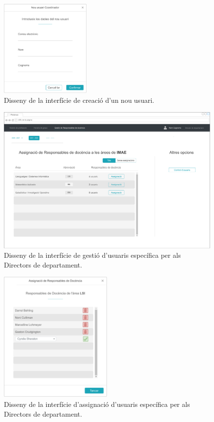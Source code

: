 \documentclass[a4paper,12pt]{ThesisStyle}
\begin{document}
\begin{figure}[H]
	\centering
	\includegraphics[width=0.4\textwidth]{assets/interfaces/administradors/gestCoords/nouUsuariDialog.pdf}
	\caption{\label{img:gestCoords_nouUsuariDialog}Disseny de la interfície de creació d'un nou usuari.}
\end{figure}

\begin{figure}[H]
	\centering
	\includegraphics[width=\textwidth]{assets/interfaces/directors/gestResp/main.pdf}
	\caption{\label{img:gestResp_main}Disseny de la interfície de gestió d'usuaris específica per als Directors de departament.}
\end{figure}

\begin{figure}[H]
	\centering
	\includegraphics[width=0.5\textwidth]{assets/interfaces/directors/gestResp/assignDialog.pdf}
	\caption{\label{img:gestResp_assignDialog}Disseny de la interfície d'assignació d'usuaris específica per als Directors de departament.}
\end{figure}
\end{document}

